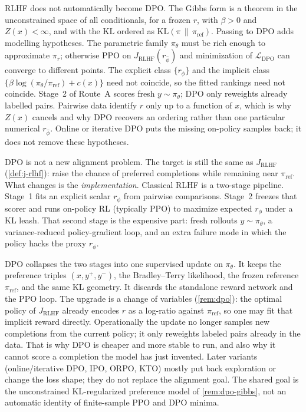 \documentclass[11pt,a4paper]{article}
\theoremstyle{definition}
\begin{document}
\begin{remark}
RLHF does not automatically become DPO. The Gibbs form is a theorem in the
unconstrained space of all conditionals, for a frozen $r$, with $\beta>0$ and
$Z(x)<\infty$, and with the KL ordered as
$\mathrm{KL}(\pi\,\|\,\pi_{\mathrm{ref}})$. Passing to DPO adds modelling
hypotheses. The parametric family $\pi_\theta$ must be rich enough to
approximate $\pi_r$; otherwise PPO on $J_{\mathrm{RLHF}}(r_{\widehat\phi})$ and
minimization of $\mathcal{L}_{\mathrm{DPO}}$ can converge to different points.
The explicit class $\{r_\phi\}$ and the implicit class
$\{\beta\log(\pi_\theta/\pi_{\mathrm{ref}})+c(x)\}$ need not coincide, so the
fitted rankings need not coincide. Stage~2 of Route~A scores fresh
$y\sim\pi_\theta$; DPO only reweights already labelled pairs. Pairwise data
identify $r$ only up to a function of $x$, which is why $Z(x)$ cancels and why
DPO recovers an ordering rather than one particular numerical $r_{\widehat\phi}$.
Online or iterative DPO puts the missing on-policy samples back; it does not
remove these hypotheses.
\end{remark}

\begin{remark}\label{rem:dpo-upgrade}
DPO is not a new alignment problem. The target is still the same as
$J_{\mathrm{RLHF}}$ (\cref{def:j-rlhf}): raise the chance of preferred completions
while remaining near $\pi_{\mathrm{ref}}$. What changes is the
\emph{implementation}. Classical RLHF is a two-stage pipeline. Stage~1 fits an
explicit scalar $r_\phi$ from pairwise comparisons. Stage~2 freezes that scorer and
runs on-policy RL (typically PPO) to maximize expected $r_\phi$ under a KL leash.
That second stage is the expensive part: fresh rollouts $y\sim\pi_\theta$, a
variance-reduced policy-gradient loop, and an extra failure mode in which the policy
hacks the proxy $r_\phi$.

DPO collapses the two stages into one supervised update on $\pi_\theta$. It keeps the
preference triples $(x,y^+,y^-)$, the Bradley--Terry likelihood, the frozen reference
$\pi_{\mathrm{ref}}$, and the same KL geometry. It discards the standalone reward
network and the PPO loop. The upgrade is a change of variables
(\cref{rem:dpo}): the optimal policy of $J_{\mathrm{RLHF}}$ already encodes $r$ as a
log-ratio against $\pi_{\mathrm{ref}}$, so one may fit that implicit reward
directly. Operationally the update no longer samples new completions from the current
policy; it only reweights labeled pairs already in the data. That is why DPO is
cheaper and more stable to run, and also why it cannot score a completion the model
has just invented. Later variants (online/iterative DPO, IPO, ORPO, KTO) mostly put
back exploration or change the loss shape; they do not replace the alignment goal.
The shared goal is the unconstrained KL-regularized preference model of
\cref{rem:dpo-gibbs}, not an automatic identity of finite-sample PPO and DPO
minima.
\end{remark}
\end{document}
